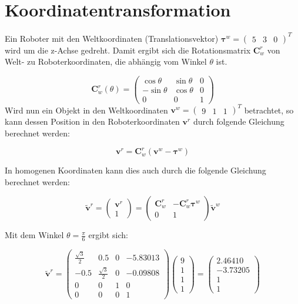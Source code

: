 \documentclass[12pt,a4paper]{report}
\begin{document}
\chapter{Koordinatentransformation}
Ein Roboter mit den Weltkoordinaten (Translationsvektor) \(\boldsymbol{\tau}^w = \begin{pmatrix} 5 & 3 & 0 \end{pmatrix}^{T}\)
wird um die z-Achse gedreht. Damit ergibt sich die Rotationsmatrix \(\mathbf{C}^r_w\) von Welt- zu Roboterkoordinaten, die
abhängig vom Winkel \(\theta\) ist.


\[
    \mathbf{C}^r_w(\theta) =
    \begin{pmatrix}
        \cos\theta  & \sin\theta & 0 \\
        -\sin\theta & \cos\theta & 0 \\
        0           & 0          & 1
    \end{pmatrix}
\]
Wird nun ein Objekt in den Weltkoordinaten \(\mathbf{v}^w = \begin{pmatrix} 9 & 1 & 1 \end{pmatrix}^{T}\) betrachtet,
so kann dessen Position in den Roboterkoordinaten \(\mathbf{v}^r\) durch folgende Gleichung berechnet werden:

\[
    \mathbf{v}^r = \mathbf{C}^r_w(\mathbf{v}^w - \boldsymbol{\tau}^w)
\]

In homogenen Koordinaten kann dies auch durch die folgende Gleichung berechnet werden:

\[
    \tilde{\mathbf{v}}^r =
    \begin{pmatrix}
        \mathbf{v}^r \\
        1
    \end{pmatrix}
    =
    \begin{pmatrix}
        \mathbf{C}^r_w & -\mathbf{C}^r_w\boldsymbol{\tau}^w \\
        0              & 1
    \end{pmatrix}
    \tilde{\mathbf{v}}^w
\]

Mit dem Winkel \(\theta = \frac{\pi}{6}\) ergibt sich:

\[
    \tilde{\mathbf{v}}^r = \begin{pmatrix}
        \frac{\sqrt{3}}{2} & 0.5                & 0 & -5.83013 \\
        -0.5               & \frac{\sqrt{3}}{2} & 0 & -0.09808 \\
        0                  & 0                  & 1 & 0        \\
        0                  & 0                  & 0 & 1
    \end{pmatrix}
    \begin{pmatrix}
        9 \\ 1 \\ 1 \\ 1
    \end{pmatrix}
    =
    \begin{pmatrix}
        2.46410 \\ -3.73205 \\ 1 \\ 1
    \end{pmatrix}
\]
\end{document}
